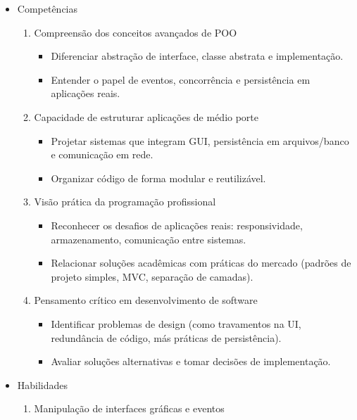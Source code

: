 \documentclass[a4paper, 12pt]{article}
\begin{document}
\begin{itemize}
    \item Competências
        \begin{enumerate}
            \item Compreensão dos conceitos avançados de POO
                \begin{itemize}
                    \item Diferenciar abstração de interface, classe abstrata e implementação.
                    \item Entender o papel de eventos, concorrência e persistência em aplicações reais.
                \end{itemize}
            \item Capacidade de estruturar aplicações de médio porte
                \begin{itemize}
                    \item Projetar sistemas que integram GUI, persistência em arquivos/banco e comunicação em rede.
                    \item Organizar código de forma modular e reutilizável.
                \end{itemize}
            \item Visão prática da programação profissional
                \begin{itemize}
                    \item Reconhecer os desafios de aplicações reais: responsividade, armazenamento, comunicação entre sistemas.
                    \item Relacionar soluções acadêmicas com práticas do mercado (padrões de projeto simples, MVC, separação de camadas).
                \end{itemize}
            \item Pensamento crítico em desenvolvimento de software
                \begin{itemize}
                    \item Identificar problemas de design (como travamentos na UI, redundância de código, más práticas de persistência).
                    \item Avaliar soluções alternativas e tomar decisões de implementação.
                \end{itemize}
        \end{enumerate}
    \item Habilidades
        \begin{enumerate}
            \item Manipulação de interfaces gráficas e eventos

\end{enumerate}
\end{itemize}
\end{document}
